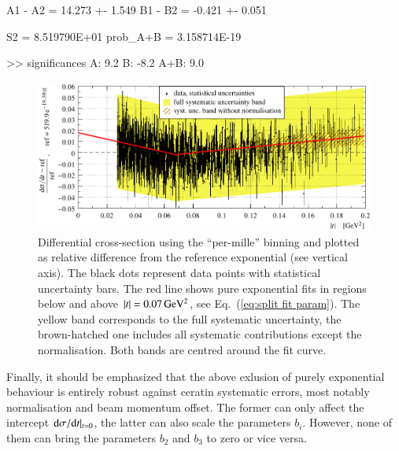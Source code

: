 A1 - A2 = 14.273 +- 1.549
B1 - B2 = -0.421 +- 0.051

S2 = 8.519790E+01
prob_A+B = 3.158714E-19

>> significances
        A: 9.2
        B: -8.2
        A+B: 9.0
\fi

\begin{figure}
\begin{center}
\includegraphics{fig/t_dist_rel_with_split_fit.pdf}
\vskip-4mm
\caption{%
Differential cross-section using the ``per-mille'' binning and plotted as relative difference from the reference exponential (see vertical axis). The black dots represent data points with statistical uncertainty bars. The red line shows pure exponential fits in regions below and above $|t| = 0.07\,{\rm GeV^2}$, see Eq.~(\ref{eq:split fit param}). The yellow band corresponds to the full systematic uncertainty, the brown-hatched one includes all systematic contributions except the normalisation. Both bands are centred around the fit curve.
}
\label{fig:data rel cpb0.001}
\end{center}
\end{figure}

Finally, it should be emphasized that the above exlusion of purely exponential behaviour is entirely robust against ceratin systematic errors, most notably normalisation and beam momentum offset. The former can only affect the intercept ${\rm d}\sigma/{\rm d} t|_{t=0}$, the latter can also scale the parameters $b_i$. However, none of them can bring the parameters $b_2$ and $b_3$ to zero or vice versa.
